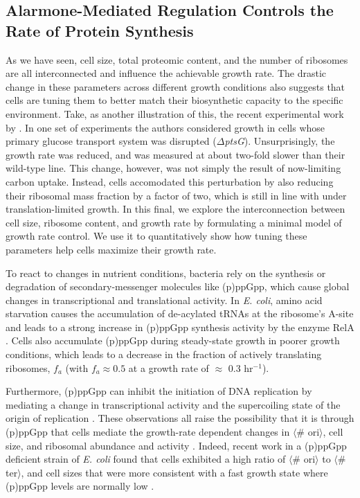 
\subsection{Alarmone-Mediated Regulation Controls the Rate of Protein Synthesis}

As we have seen, cell size, total proteomic content, and the number of ribosomes
are all interconnected and influence the achievable growth rate. The drastic
change in these parameters across different growth conditions also suggests that
cells are tuning them to better match their biosynthetic capacity to the
specific environment. Take, as another illustration of this, the recent
experimental work by \cite{dai2016}. In one set of experiments the authors
considered growth in cells whose  primary glucose transport system was disrupted
($\Delta$\textit{ptsG}). Unsurprisingly, the growth rate was reduced, and was
measured at about two-fold slower than their wild-type line.  This change,
however, was not simply the result of now-limiting carbon uptake. Instead, cells
accomodated this perturbation by also reducing their ribosomal mass fraction by
a factor of two, which is still in line with 
under translation-limited growth.  In this final, we explore the interconnection
between cell size, ribosome content, and growth rate by formulating a minimal
model of growth rate control.  We use it to quantitatively show how tuning these
parameters help cells maximize their growth rate.

To react to changes in nutrient conditions, bacteria rely on the synthesis or
degradation of secondary-messenger molecules  like (p)ppGpp, which cause global
changes in transcriptional and translational activity. In \textit{E. coli},
amino acid starvation causes the accumulation of de-acylated tRNAs at the
ribosome's A-site and leads to a strong increase in (p)ppGpp synthesis activity
by the enzyme RelA \citep{hauryliuk2015}. Cells also accumulate (p)ppGpp  during
steady-state growth in poorer growth conditions, which leads to a decrease in
the fraction of actively translating ribosomes, $f_a$  (with $f_a \approx 0.5$
at a growth rate of $\approx$ 0.3 hr$^{-1}$).

Furthermore, (p)ppGpp can inhibit the initiation of DNA replication by mediating
a change in transcriptional activity and the supercoiling state of the origin of
replication \citep{kraemer2019}. These observations all raise the possibility
that it is through (p)ppGpp that cells mediate the growth-rate dependent changes
in $\langle$\# ori$\rangle$, cell size, and ribosomal abundance and activity
\citep{zhu2019, Buke2020}. Indeed, recent work in a (p)ppGpp deficient strain of
\textit{E. coli} found that cells exhibited a high ratio of $\langle$\#
ori$\rangle$ to $\langle$\# ter$\rangle$, and cell sizes that were more
consistent with a fast growth state where (p)ppGpp levels are normally low
\citep{fernandezcoll2020}.

